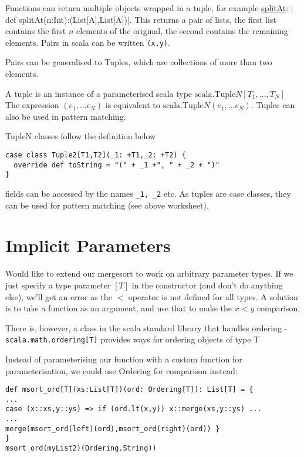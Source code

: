 Functions can return multiple objects wrapped in a tuple, for example \href{https://www.scala-lang.org/api/2.12.3/scala/collection/immutable/List.html#splitAt(n:Int):(List[A],List[A])}{splitAt}:  \listInline| def splitAt(n:Int):(List[A],List[A])|. This returns a pair of lists, the first list contains the first $n$ elements of the original, the second contains the remaining elements. Pairs in scala can be written \lstinline|(x,y)|.

Pairs can be generalised to Tuples, which are collections of more than two elements.

A tuple is an instance of a parameterised scala type $\mathrm{scala.Tuple}N[T_1,...,T_N]$
The expression $(e_1,...e_N)$ is equivalent to $\mathrm{scala.Tuple}N(e_1,...e_N)$. Tuples can also be used in pattern matching.

TupleN classes follow the definition below
\begin{lstlisting}
case class Tuple2[T1,T2](_1: +T1,_2: +T2) {
  override def toString = "(" + _1 +", " + _2 + ")"
}
\end{lstlisting}
fields can be accessed by the names \lstinline|_1, _2| etc. As tuples are case classes, they can be used for pattern matching (see above worksheet).

\section{Implicit Parameters}

Would like to extend our mergesort to work on arbitrary parameter types. If we just specify a type parameter $[T]$ in the constructor (and don't do anything else), we'll get an error as the $<$ operator is not defined for all types. A solution is to take a function as an argument, and use that to make the $ x < y$ comparison.

There is, however, a class in the scala standard library that handles ordering - \lstinline|scala.math.ordering[T]| provides ways for ordering objects of type T

Instead of parameterising our function with a custom function for parameterisation, we could use Ordering for comparison instead:
\begin{lstlisting}
def msort_ord[T](xs:List[T])(ord: Ordering[T]): List[T] = {
...
case (x::xs,y::ys) => if (ord.lt(x,y)) x::merge(xs,y::ys) ...
...
merge(msort_ord(left)(ord),msort_ord(right)(ord)) }
}
msort_ord(myList2)(Ordering.String))
\end{lstlisting}

